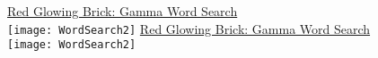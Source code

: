 \documentclass[white]{GL2020}
\begin{document}
\name{\wWordSearchGamma{}}

\vspace*{0.5cm}
\begin{center}
{\LARGE \underline{Red Glowing Brick: Gamma Word Search}}\\
\vspace{0.5cm}
\texttt{[image: WordSearch2]}
\vfill
{\LARGE \underline{Red Glowing Brick: Gamma Word Search}}\\
\vspace{0.5cm}
\texttt{[image: WordSearch2]}
\end{center}
\end{document}
